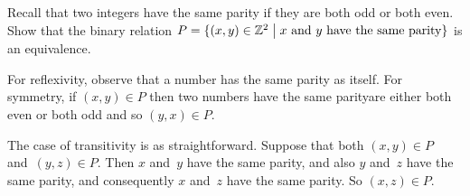 \documentclass{test}  %
\begin{document}
\begin{problem}
\end{problem}

\begin{problem}
Recall that two integers have the same parity if they are both odd or 
both even.
Show that the binary relation 
$P=\{(x,y)\in\mathbb{Z}^2 \bigm| \text{$x$ and $y$ have the same parity}\}$  
is an equivalence.
\begin{answer}
For reflexivity, observe that a number has the same parity as itself.
For symmetry, if $(x,y)\in P$ then
two numbers have the same parity\Dash are either both even or both odd\Dash
and so $(y,x)\in P$.

The case of transitivity is as straightforward.
Suppose that both $(x,y)\in P$ and~$(y,z)\in P$.
Then $x$ and~$y$ have the same parity, and also $y$ and~$z$ have the same
parity, and consequently $x$ and~$z$ have the same parity.
So $(x,z)\in P$.  
\end{answer}
\end{problem}
\end{document}
